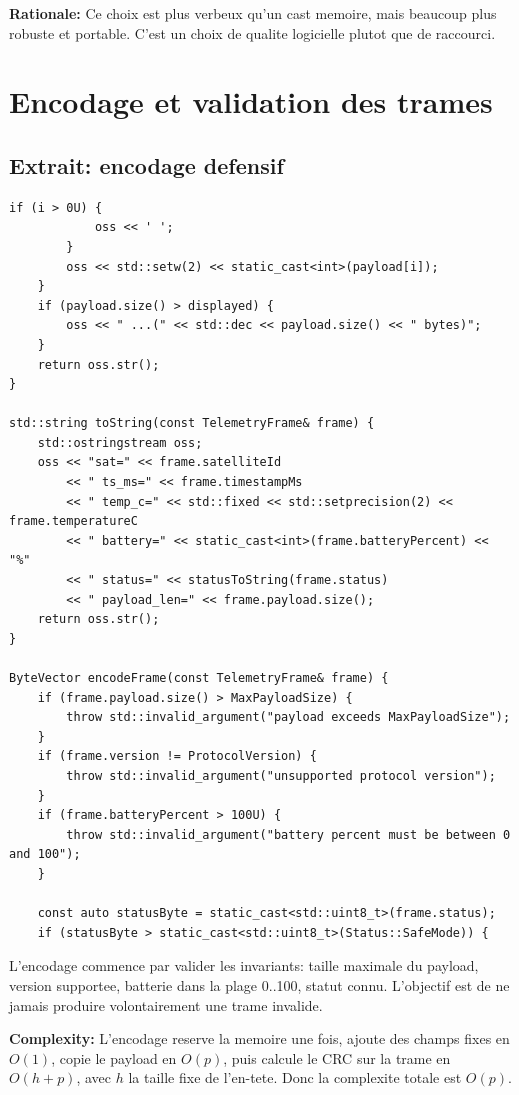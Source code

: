 \documentclass[10pt,a4paper]{article}
\newcommand{\complexity}[1]{\textbf{Complexity:} #1}
\newcommand{\rationale}[1]{\textbf{Rationale:} #1}
\begin{document}
\rationale{Ce choix est plus verbeux qu'un cast memoire, mais beaucoup plus robuste et portable. C'est un choix de qualite logicielle plutot que de raccourci.}

\section{Encodage et validation des trames}

\subsection{Extrait: encodage defensif}
\begin{lstlisting}[caption={Encodage d une trame avec validations prealables}]
        if (i > 0U) {
            oss << ' ';
        }
        oss << std::setw(2) << static_cast<int>(payload[i]);
    }
    if (payload.size() > displayed) {
        oss << " ...(" << std::dec << payload.size() << " bytes)";
    }
    return oss.str();
}

std::string toString(const TelemetryFrame& frame) {
    std::ostringstream oss;
    oss << "sat=" << frame.satelliteId
        << " ts_ms=" << frame.timestampMs
        << " temp_c=" << std::fixed << std::setprecision(2) << frame.temperatureC
        << " battery=" << static_cast<int>(frame.batteryPercent) << "%"
        << " status=" << statusToString(frame.status)
        << " payload_len=" << frame.payload.size();
    return oss.str();
}

ByteVector encodeFrame(const TelemetryFrame& frame) {
    if (frame.payload.size() > MaxPayloadSize) {
        throw std::invalid_argument("payload exceeds MaxPayloadSize");
    }
    if (frame.version != ProtocolVersion) {
        throw std::invalid_argument("unsupported protocol version");
    }
    if (frame.batteryPercent > 100U) {
        throw std::invalid_argument("battery percent must be between 0 and 100");
    }

    const auto statusByte = static_cast<std::uint8_t>(frame.status);
    if (statusByte > static_cast<std::uint8_t>(Status::SafeMode)) {
\end{lstlisting}


L'encodage commence par valider les invariants: taille maximale du payload, version supportee, batterie dans la plage 0..100, statut connu. L'objectif est de ne jamais produire volontairement une trame invalide.

\complexity{L'encodage reserve la memoire une fois, ajoute des champs fixes en $O(1)$, copie le payload en $O(p)$, puis calcule le CRC sur la trame en $O(h+p)$, avec $h$ la taille fixe de l'en-tete. Donc la complexite totale est $O(p)$.}
\end{document}
